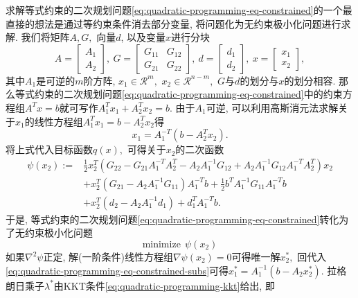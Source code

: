 \documentclass{SBCbookchapter}
\newcommand{\R}{\mathcal{R}}
\numberwithin{equation}{section}
\begin{document}
求解等式约束的二次规划问题\eqref{eq:quadratic-programming-eq-constrained}的一个最直接的想法是通过等约束条件消去部分变量, 将问题化为无约束极小化问题进行求解. 我们将矩阵$A, G,$ 向量$d$, 以及变量$x$进行分块
\begin{equation*}
A = \begin{bmatrix} A_1 \\ A_2 \end{bmatrix}, ~ G = \begin{bmatrix} G_{11} & G_{12} \\ G_{21} & G_{22} \end{bmatrix}, ~ d = \begin{bmatrix} d_1 \\ d_2 \end{bmatrix}, ~ x = \begin{bmatrix} x_1 \\ x_2 \end{bmatrix},
\end{equation*}
其中$A_1$是可逆的$m$阶方阵, $x_1 \in \R^{m},$ $x_2 \in \R^{n-m},$ $G$与$d$的划分与$x$的划分相容. 那么等式约束的二次规划问题\eqref{eq:quadratic-programming-eq-constrained}中的约束方程组$A^T x = b$就可写作$A_1^T x_1 + A_2^T x_2 = b.$ 由于$A_1$可逆, 可以利用高斯消元法求解关于$x_1$的线性方程组$A_1^Tx_1 = b - A_2^Tx_2$得
\begin{equation}
\label{eq:quadratic-programming-eq-constrained-subs}
x_1 = A_1^{-T} (b - A_2^Tx_2).
\end{equation}
将上式代入目标函数$q(x),$ 可得关于$x_2$的二次函数
\begin{equation}
\begin{aligned}
\psi (x_2) := & \frac{1}{2} x_2^T \left( G_{22} - G_{21} A_1^{-T} A_2^T - A_2 A_1^{-1} G_{12} + A_2 A_1^{-1} G_{12} A_1^{-T} A_2^T \right) x_2 \\
& + x_2^T \left( G_{21} - A_2 A_1^{-1} G_{11} \right) A_1^{-T} b + \frac{1}{2} b^T A_1^{-1} G_{11} A_1^{-T} b \\
& + x_2^T \left( d_2 - A_2 A_1^{-1} d_1 \right) + d_1^T A_1^{-T} b.
\end{aligned}
\end{equation}
于是, 等式约束的二次规划问题\eqref{eq:quadratic-programming-eq-constrained}转化为了无约束极小化问题
\begin{equation*}
\text{minimize} ~~ \psi(x_2)
\end{equation*}
如果$\nabla^2 \psi$正定, 解(一阶条件)线性方程组$\nabla \psi (x_2) = 0$可得唯一解$x_2^*,$ 回代入\eqref{eq:quadratic-programming-eq-constrained-subs}可得$x_1^* = A_1^{-1} (b - A_2x_2^*).$ 拉格朗日乘子$\lambda^*$由KKT条件\eqref{eq:quadratic-programming-kkt}给出, 即
\end{document}

